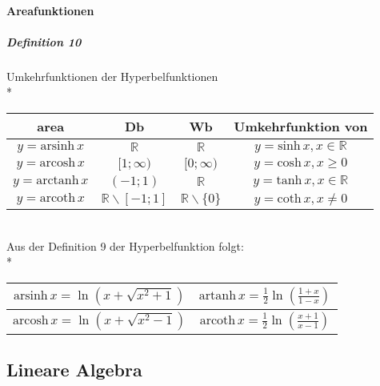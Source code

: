 \documentclass[a4paper]{scrartcl}
\begin{document}
\paragraph{Areafunktionen}
\subparagraph{Definition 10} Umkehrfunktionen der Hyperbelfunktionen\\*
\begin{tabular}{c|c|c|c}
area & Db & Wb & Umkehrfunktion von\\\hline
$y=\text{arsinh} \, x$ & $\mathbb{R}$ & $\mathbb{R}$ & $y=\text{sinh} \, x, x \in \mathbb{R}$\\
$y=\text{arcosh}\, x$ & $[1;\infty)$ & $[0;\infty)$ & $y=\text{cosh}\, x , x \geq 0$\\
$y=\text{arctanh}\, x$ & $(-1;1)$ & $\mathbb{R}$ & $y=\text{tanh}\, x , x \in \mathbb{R}$\\
$y=\text{arcoth}\, x$ & $ \mathbb{R} \backslash [-1;1]$ & $\mathbb{R} \backslash \{ 0 \} $ & $y=\text{coth}\, x, x\neq 0$\\

\end{tabular}\\
Aus der Definition 9 der Hyperbelfunktion folgt:\\*
\begin{tabular}{c|c}
$\text{arsinh}\, x = \ln{ (x + \sqrt{x^2+1})}$ & $ \text{artanh}\, x = \frac{1}{2} \ln{(\frac{1+x}{1-x} ) }$\\ \hline
$\text{arcosh}\, x = \ln{(x+\sqrt{x^2 -1})}$ & $\text{arcoth}\, x = \frac{1}{2} \ln{(\frac{x+1}{x-1})}$\\
\end{tabular}

\subsection{Lineare Algebra}
\end{document}
